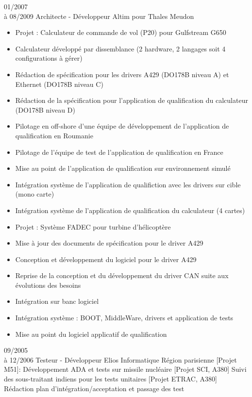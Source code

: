 \documentclass[10pt,a4paper]{moderncv}       %
\begin{document}
\cventry
{01/2007\\à 08/2009}       %
{Architecte - Développeur} %
{Altim pour Thales}        %
{Meudon}                   %
{}                         %
{
\begin{itemize}
  \item Projet : Calculateur de commande de vol (P20) pour Gulfstream G650
  \item Calculateur développé par dissemblance (2 hardware, 2 langages soit 4 configurations à gérer)
  \item Rédaction de spécification pour les drivers A429 (DO178B niveau A) et Ethernet (DO178B niveau C)
  \item Rédaction de la spécification pour l'application de qualification du calculateur (DO178B niveau D)
  \item Pilotage en off-shore d'une équipe de développement de l'application de qualification en Roumanie
  \item Pilotage de l'équipe de test de l'application de qualification en France
  \item Mise au point de l'application de qualification sur environnement simulé
  \item Intégration système de l'application de qualifiction avec les drivers sur cible (mono carte)
  \item Intégration système de l'application de qualification du calculateur (4 cartes)
  \item Projet : Système FADEC pour turbine d'hélicoptère
  \item Mise à jour des documents de spécification pour le driver A429
  \item Conception et développement du logiciel pour le driver A429
  \item Reprise de la conception et du développement du driver CAN suite aux évolutions des besoins
  \item Intégration sur banc logiciel
  \item Intégration système : BOOT, MiddleWare, drivers et application de tests
  \item Mise au point du logiciel applicatif de qualification
\end{itemize}
\newline{}}
\cventry
{09/2005\\à 12/2006}    %
{Testeur - Développeur} %
{Elios Informatique}    %
{Région parisienne}     %
{}                      %
{
[Projet M51]: Développement ADA et tests sur missile nucléaire
\newline{}
[Projet SCI, A380] Suivi des sous-traitant indiens pour les tests unitaires
\newline{}
[Projet ETRAC, A380] Rédaction plan d’intégration/acceptation et passage
  des test
\newline{}}
\end{document}
